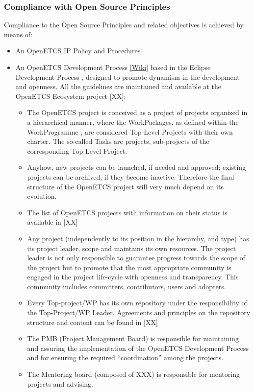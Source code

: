 \documentclass{template/openetcs_article}
\begin{document}
\subsubsection{Compliance with Open Source Principles}
Compliance to the Open Source Principles and related objectives is achieved by means of:
\begin{itemize}
\item An OpenETCS IP Policy and Procedures \citep{IPP}
\item An OpenETCS Development Process \citep{odp} \href{https://github.com/openETCS/ecosystem/wiki/openETCS-Development-Process}{[Wiki]} based in the Eclipse Development Process \citep{EDP}, designed to promote dynamism in the development and openness. All the guidelines are maintained and available at the OpenETCS Ecosystem project [XX]: 
\begin{itemize}
\item The OpenETCS project is conceived as a project of projects organized in a hierarchical manner, where the WorkPackages, as defined within the WorkProgramme \citep{fpp}, are considered Top-Level Projects with their own charter. The so-called Tasks are projects, sub-projects of the corresponding Top-Level Project.
\item Anyhow, new projects can be launched, if needed and approved; existing projects can be archived, if they become inactive. Therefore the final structure of the OpenETCS project will very much depend on its evolution.  
\item The list of OpenETCS projects with information on their status is available in [XX]
\item Any project (independently to its position in the hierarchy, and type) has its project leader, scope and maintains its own resources. The project leader is not only responsible to guarantee progress towards the scope of the project but to promote that the most appropriate community is engaged in the project life-cycle with openness and transparency. This community includes committers, contributors, users and adopters.
\item Every Top-project/WP has its own repository under the responsibility of the Top-Project/WP Leader. Agreements and principles on the repository structure and content can be found in [XX] 
\item The PMB (Project Management Board) is responsible for maintaining and assuring the implementation of the OpenETCS Development Process and for ensuring the required “coordination” among the projects.
\item The Mentoring board (composed of XXX) is responsible for mentoring projects and advising.

\end{itemize}
\end{itemize}
\end{document}
